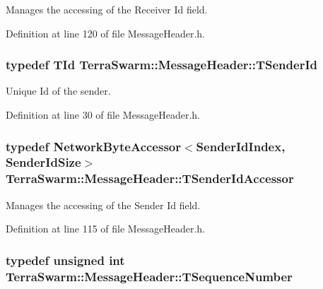 Manages the accessing of the Receiver Id field. 



Definition at line 120 of file Message\-Header.\-h.

\hypertarget{class_terra_swarm_1_1_message_header_a516b36855e2aad7cfbf8770f1b42784f}{
\subsubsection[{T\-Sender\-Id}]{\setlength{\rightskip}{0pt plus 5cm}typedef {\bf T\-Id} {\bf Terra\-Swarm\-::\-Message\-Header\-::\-T\-Sender\-Id}}}\label{class_terra_swarm_1_1_message_header_a516b36855e2aad7cfbf8770f1b42784f}


Unique Id of the sender. 



Definition at line 30 of file Message\-Header.\-h.

\hypertarget{class_terra_swarm_1_1_message_header_aa4003ec191b4bf2a4e38cc289bb10e70}{
\subsubsection[{T\-Sender\-Id\-Accessor}]{\setlength{\rightskip}{0pt plus 5cm}typedef {\bf Network\-Byte\-Accessor}$<${\bf Sender\-Id\-Index}, {\bf Sender\-Id\-Size}$>$ {\bf Terra\-Swarm\-::\-Message\-Header\-::\-T\-Sender\-Id\-Accessor}\hspace{0.3cm}{\ttfamily [private]}}}\label{class_terra_swarm_1_1_message_header_aa4003ec191b4bf2a4e38cc289bb10e70}


Manages the accessing of the Sender Id field. 



Definition at line 115 of file Message\-Header.\-h.

\hypertarget{class_terra_swarm_1_1_message_header_a0d92af0bc15cc856a21975d1f3813eb5}{
\subsubsection[{T\-Sequence\-Number}]{\setlength{\rightskip}{0pt plus 5cm}typedef unsigned int {\bf Terra\-Swarm\-::\-Message\-Header\-::\-T\-Sequence\-Number}\hspace{0.3cm}{\ttfamily [private]}}}\label{class_terra_swarm_1_1_message_header_a0d92af0bc15cc856a21975d1f3813eb5}


